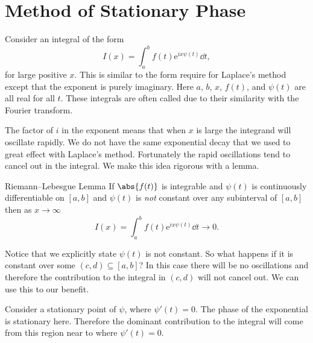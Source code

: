\documentclass[fleqn]{NotesClass}
\newcommand*{\e}{\mathrm{e}}
\begin{document}
    \section{Method of Stationary Phase}
    Consider an integral of the form
    \begin{equation}
        I(x) = \int_a^b f(t) \e^{ix\psi(t)} \dd{t},
    \end{equation}
    for large positive \(x\).
    This is similar to the form require for Laplace's method except that the exponent is purely imaginary.
    Here \(a\), \(b\), \(x\), \(f(t)\), and \(\psi(t)\) are all real for all \(t\).
    These integrals are often called  due to their similarity with the Fourier transform.
    
    The factor of \(i\) in the exponent means that when \(x\) is large the integrand will oscillate rapidly.
    We do not have the same exponential decay that we used to great effect with Laplace's method.
    Fortunately the rapid oscillations tend to cancel out in the integral.
    We make this idea rigorous with a lemma.
    
    \begin{lma}{Riemann--Lebesgue Lemma}{}
        If \(\abs{f(t)}\) is integrable and \(\psi(t)\) is continuously differentiable on \([a, b]\) and \(\psi(t)\) is \emph{not} constant over any subinterval of \([a, b]\) then as \(x \to \infty\)
        \begin{equation}
            I(x) = \int_a^b f(t)\e^{ix\psi(t)} \dd{t} \to 0.
        \end{equation}
    \end{lma}
    
    Notice that we explicitly state \(\psi(t)\) is not constant.
    So what happens if it is constant over some \((c, d) \subseteq [a, b]\)?
    In this case there will be no oscillations and therefore the contribution to the integral in \((c, d)\) will not cancel out.
    We can use this to our benefit.
    
    Consider a stationary point of \(\psi\), where \(\psi'(t) = 0\).
    The phase of the exponential is stationary here.
    Therefore the dominant contribution to the integral will come from this region near to where \(\psi'(t) = 0\).
    
\end{document}
